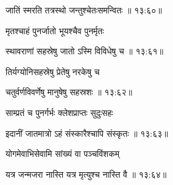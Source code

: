 
{\devanagarifont जातिं स्मरति तत्रस्थो जन्तुश्चेतःसमन्वितः {॥ १३:६०॥} \veg\dontdisplaylinenum }%

{\devanagarifont मृतश्चाहं पुनर्जातो भूयश्चैव पुनर्मृतः \thinspace{\dandab} \dontdisplaylinenum }%


{\devanagarifont स्थावराणां सहस्रेषु जातो ऽस्मि विविधेषु च {॥ १३:६१॥} \veg\dontdisplaylinenum }%
 
{\devanagarifont तिर्यग्योनिसहस्रेषु प्रेतेषु नरकेषु च \thinspace{\dandab} \dontdisplaylinenum }%
  

{\devanagarifont चतुर्वर्णविवर्णेषु मानुषेषु सहस्रशः {॥ १३:६२॥} \veg\dontdisplaylinenum }%
 
{\devanagarifont साम्प्रतं च पुनर्गर्भः क्लेशप्राप्तः सुदुःसहः \thinspace{\dandab} \dontdisplaylinenum }%


{\devanagarifont इदानीं जातमात्रो ऽहं संस्कारैश्चापि संस्कृतः {॥ १३:६३॥} \veg\dontdisplaylinenum }%

{\devanagarifont योगमेवाभिसेवामि सांख्यं वा पञ्चविंशकम् \thinspace{\dandab} \dontdisplaylinenum }%


{\devanagarifont यत्र जन्मजरा नास्ति यत्र मृत्युश्च नास्ति वै {॥ १३:६४॥} \veg\dontdisplaylinenum }%
 
